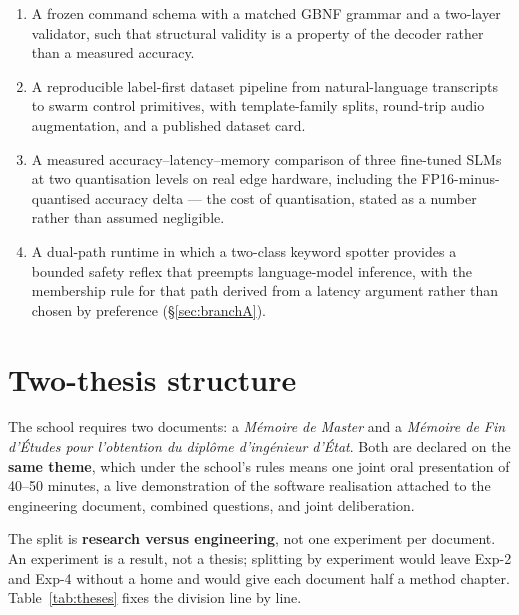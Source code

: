 \documentclass[11pt,a4paper]{article}
\begin{document}
\begin{enumerate}[leftmargin=1.8em,itemsep=3pt,label=\textbf{C\arabic*.}]
  \item A frozen command schema with a matched GBNF grammar and a two-layer validator, such that
        structural validity is a property of the decoder rather than a measured accuracy.
  \item A reproducible label-first dataset pipeline from natural-language transcripts to swarm control
        primitives, with template-family splits, round-trip audio augmentation, and a published dataset
        card.
  \item A measured accuracy--latency--memory comparison of three fine-tuned SLMs at two quantisation
        levels on real edge hardware, including the FP16-minus-quantised accuracy delta --- the cost of
        quantisation, stated as a number rather than assumed negligible.
  \item A dual-path runtime in which a two-class keyword spotter provides a bounded safety reflex that
        preempts language-model inference, with the membership rule for that path derived from a latency
        argument rather than chosen by preference (\S\ref{sec:branchA}).
\end{enumerate}

\section{Two-thesis structure}
\label{sec:theses}

The school requires two documents: a \emph{M\'emoire de Master} and a \emph{M\'emoire de Fin d'\'Etudes
pour l'obtention du dipl\^ome d'ing\'enieur d'\'Etat}. Both are declared on the \textbf{same theme}, which
under the school's rules means one joint oral presentation of 40--50 minutes, a live demonstration of the
software realisation attached to the engineering document, combined questions, and joint deliberation.

The split is \textbf{research versus engineering}, not one experiment per document. An experiment is a
result, not a thesis; splitting by experiment would leave Exp-2 and Exp-4 without a home and would give
each document half a method chapter. Table~\ref{tab:theses} fixes the division line by line.
\end{document}
